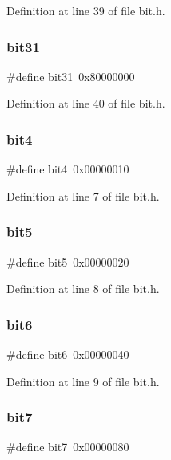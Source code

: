 Definition at line 39 of file bit.\+h.

\mbox{\label{bit_8h_a465e7af11ea7cc6e38ae1f09546505b4}} 
\subsubsection{bit31}
{\footnotesize\ttfamily \#define bit31~0x80000000}



Definition at line 40 of file bit.\+h.

\mbox{\label{bit_8h_a1f84576f666cc4800d0556d265ab5ed8}} 
\subsubsection{bit4}
{\footnotesize\ttfamily \#define bit4~0x00000010}



Definition at line 7 of file bit.\+h.

\mbox{\label{bit_8h_ab6c3753db67fb1010e27e43034e8c573}} 
\subsubsection{bit5}
{\footnotesize\ttfamily \#define bit5~0x00000020}



Definition at line 8 of file bit.\+h.

\mbox{\label{bit_8h_acc72d06f0b423735d7874ff1b63505ec}} 
\subsubsection{bit6}
{\footnotesize\ttfamily \#define bit6~0x00000040}



Definition at line 9 of file bit.\+h.

\mbox{\label{bit_8h_aee841ef13dc8c3ee8836a341a02f76c7}} 
\subsubsection{bit7}
{\footnotesize\ttfamily \#define bit7~0x00000080}



